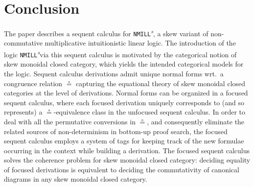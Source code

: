 \documentclass[copyright,creativecommons]{eptcs}
\newtheorem{theorem}{Theorem}[section]
\theoremstyle{definition}
\newcommand{\RI}{\mathsf{RI}}
\newcommand{\NMILL}{\texttt{NMILL}}
\newcommand{\SkNMILL}{\NMILL\textsuperscript{\textit{s}}}
\begin{document}
\vspace{-.5cm}
\section{Conclusion}

The paper describes a sequent calculus for \SkNMILL, a skew variant of non-commutative multiplicative intuitionistic linear logic. The introduction of the logic \SkNMILL via this sequent calculus is motivated by the categorical notion of skew monoidal closed category, which yields the intended categorical models for the logic. Sequent calculus derivations admit unique normal forms wrt.\ a congruence relation $\circeq$ capturing the equational theory of skew monoidal closed categories at the level of derivations. Normal forms can be organized in a focused sequent calculus, where each focused derivation uniquely corresponds to (and so represents) a $\circeq$-equivalence class in the unfocused sequent calculus. In order to deal with all the permutative conversions in $\circeq$, and consequently eliminate the related sources of non-determinism in bottom-up proof search, the focused sequent calculus employs a system of tags for keeping track of the new formulae occurring in the context while building a derivation. The focused sequent calculus solves the coherence problem for skew monoidal closed category: deciding equality of focused derivations is equivalent to deciding the commutativity of canonical diagrams in any skew monoidal closed category.
\end{document}

